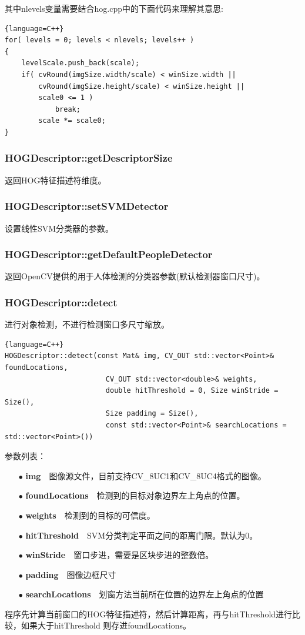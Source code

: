 \documentclass[10pt,technote,onecolumn,twoside]{IEEEtran}
\begin{document}
其中\textsf{nlevels}变量需要结合\textsf{hog.cpp}中的下面代码来理解其意思:
\begin{lstlisting}{language=C++}
for( levels = 0; levels < nlevels; levels++ )
{
	levelScale.push_back(scale);
    if( cvRound(imgSize.width/scale) < winSize.width ||
        cvRound(imgSize.height/scale) < winSize.height ||
        scale0 <= 1 )
            break;
        scale *= scale0;
}
\end{lstlisting}

\subsubsection{HOGDescriptor::getDescriptorSize}
返回HOG特征描述符维度。
\subsubsection{HOGDescriptor::setSVMDetector}
设置线性SVM分类器的参数。
\subsubsection{HOGDescriptor::getDefaultPeopleDetector}
返回OpenCV提供的用于人体检测的分类器参数(默认检测器窗口尺寸)。
\subsubsection{HOGDescriptor::detect}
进行对象检测，不进行检测窗口多尺寸缩放。
\begin{lstlisting}{language=C++}
HOGDescriptor::detect(const Mat& img, CV_OUT std::vector<Point>& foundLocations,
                        CV_OUT std::vector<double>& weights,
                        double hitThreshold = 0, Size winStride = Size(),
                        Size padding = Size(),
                        const std::vector<Point>& searchLocations = std::vector<Point>())
\end{lstlisting}
参数列表：
\begin{enumerate}
\item[$\bullet$]\textbf{img}~~图像源文件，目前支持\textsf{CV\_8UC1}和\textsf{CV\_8UC4}格式的图像。
\item[$\bullet$]\textbf{foundLocations}~~检测到的目标对象边界左上角点的位置。
\item[$\bullet$]\textbf{weights}~~检测到的目标的可信度。
\item[$\bullet$]\textbf{hitThreshold}~~SVM分类判定平面之间的距离门限。默认为0。
\item[$\bullet$]\textbf{winStride}~~窗口步进，需要是区块步进的整数倍。
\item[$\bullet$]\textbf{padding}~~图像边框尺寸
\item[$\bullet$]\textbf{searchLocations}~~划窗方法当前所在位置的边界左上角点的位置
\end{enumerate}
程序先计算当前窗口的HOG特征描述符，然后计算距离，再与\textsf{hitThreshold}进行比较，如果大于\textsf{hitThreshold}
则存进\textsf{foundLocations}。
\end{document}
